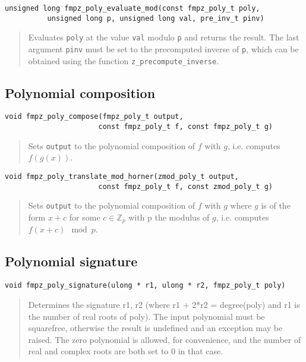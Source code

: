 \documentclass[a4paper,10pt]{article}
\newcommand{\Z}{\mathbb{Z}}
\newcommand{\code}{\lstinline}
\begin{document}
\begin{lstlisting}
unsigned long fmpz_poly_evaluate_mod(const fmpz_poly_t poly,
	      unsigned long p, unsigned long val, pre_inv_t pinv) 
\end{lstlisting}
\begin{quote}
Evaluates \code{poly} at the value \code{val} modulo \code{p} and returns the result. The last argument \code{pinv} must be set to the precomputed inverse of \code{p}, which can be obtained using the function \code{z_precompute_inverse}.
\end{quote}

\subsection{Polynomial composition}
\begin{lstlisting}
void fmpz_poly_compose(fmpz_poly_t output, 
                      const fmpz_poly_t f, const fmpz_poly_t g) 
\end{lstlisting}
\begin{quote}
Sets \code{output} to the polynomial composition of $f$ with $g$, i.e. computes $f(g(x))$.
\end{quote}
 
\begin{lstlisting}
void fmpz_poly_translate_mod_horner(zmod_poly_t output, 
                      const fmpz_poly_t f, const zmod_poly_t g) 
\end{lstlisting}
\begin{quote}
Sets \code{output} to the polynomial composition of $f$ with $g$ where $g$ is of the form $x+c$ for some $c\in\Z_p$ with p the modulus of $g$, i.e. computes $f(x+c) \mod p$.
\end{quote}

\subsection{Polynomial signature}

\begin{lstlisting}
void fmpz_poly_signature(ulong * r1, ulong * r2, fmpz_poly_t poly)
\end{lstlisting}
\begin{quote}
Determines the signature r1, r2 (where r1 + 2*r2 = degree(poly) and r1 is the number of real roots of poly). The input polynomial must be squarefree, otherwise the result is undefined and an exception may be raised. The zero polynomial is allowed, for convenience, and the number of real and complex roots are both set to 0 in that case.
\end{quote}
\end{document}
